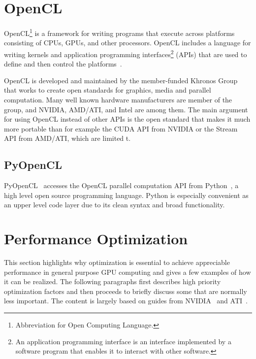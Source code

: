 \documentclass[11pt,twoside]{report}
\begin{document}
\section{OpenCL}
OpenCL\footnote{Abbreviation for Open Computing Language.} is a framework for writing programs that execute across platforms consisting of CPUs, GPUs, and other processors. OpenCL includes a language for writing kernels and application programming interfaces\footnote{An application programming interface is an interface implemented by a software program that enables it to interact with other software.} (APIs) that are used to define and then control the platforms~\cite{OpenCL.spec}.

\indent OpenCL is developed and maintained by the member-funded Khronos Group that works to create open standards for graphics, media and parallel computation. Many well known hardware manufacturers are member of the group, and NVIDIA, AMD/ATI, and Intel are among them. The main argument for using OpenCL instead of other APIs is the open standard that makes it much more portable than for example the CUDA API from NVIDIA or the Stream API from AMD/ATI, which are limited t.


\subsection{PyOpenCL}
PyOpenCL~\cite{PyOpenCLweb} accesses the OpenCL parallel computation API from Python~\cite{10.1109/MCSE.2007.58}, a high level open source programming language. Python is especially convenient as an upper level code layer due to its clean syntax and broad functionality.

\section{Performance Optimization\label{sec:performance}}
This section highlights why optimization is essential to achieve appreciable performance in general purpose GPU computing and gives a few examples of how it can be realized. The following paragraphs first describes high priority optimization factors and then proceeds to briefly discuss some  that  are normally less important. The content is largely based on guides from NVIDIA~\cite{opencl.best.practices, opencl.programming} and ATI~\cite{ATIguide}.
\end{document}
